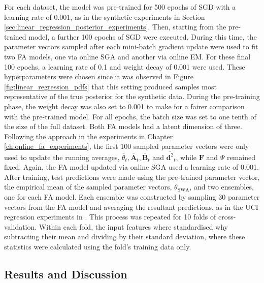 \documentclass[msc,deptreport.inf]{infthesis} %
\newcommand{\matr}[1]{\mathbf{#1}}
\begin{document}
For each dataset, the model was pre-trained for 500 epochs of SGD with a learning rate of 0.001, as in the synthetic experiments in Section \ref{sec:linear_regression_posterior_experiments}. Then, starting from the pre-trained model, a further 100 epochs of SGD were executed. During this time, the parameter vectors sampled after each mini-batch gradient update were used to fit two FA models, one via online SGA and another via online EM. For these final 100 epochs, a learning rate of 0.1 and weight decay of 0.001 were used. These hyperparameters were chosen since it was observed in Figure \ref{fig:linear_regression_pdfs} that this setting produced samples most representative of the true posterior for the synthetic data. During the pre-training phase, the weight decay was also set to 0.001 to make for a fairer comparison with the pre-trained model. For all epochs, the batch size was set to one tenth of the size of the full dataset. Both FA models had a latent dimension of three. Following the approach in the experiments in Chapter \ref{ch:online_fa_experiments}, the first 100 sampled parameter vectors were only used to update the running averages, $\overline{\theta}_t, \overline{\matr{A}}_t, \overline{\matr{B}}_t$ and $\overline{\matr{d}^2}_t$, while $\matr{F}$ and $\Psi$ remained fixed. Again, the FA model updated via online SGA used a learning rate of 0.001. After training, test predictions were made using the pre-trained parameter vector, the empirical mean of the sampled parameter vectors, $\theta_{\text{SWA}}$, and two ensembles, one for each FA model. Each ensemble was constructed by sampling 30 parameter vectors from the FA model and averaging the resultant predictions, as in the UCI regression experiments in \cite{maddox2019}. This process was repeated for 10 folds of cross-validation. Within each fold, the input features where standardised why subtracting their mean and dividing by their standard deviation, where these statistics were calculated using the fold's training data only. 


\subsection{Results and Discussion}
\end{document}
